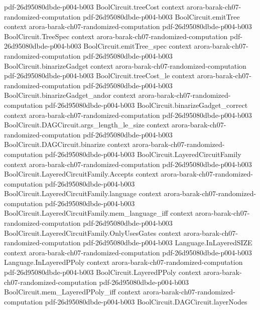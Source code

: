\begin{theorem}
  {pdf-26d95080dbde-p004-b003}
\proofstep
  {BoolCircuit.treeCost}
  {context}
  {arora-barak-ch07-randomized-computation}
  {pdf-26d95080dbde-p004-b003}
\proofstep
  {BoolCircuit.emitTree}
  {context}
  {arora-barak-ch07-randomized-computation}
  {pdf-26d95080dbde-p004-b003}
\proofstep
  {BoolCircuit.TreeSpec}
  {context}
  {arora-barak-ch07-randomized-computation}
  {pdf-26d95080dbde-p004-b003}
\proofstep
  {BoolCircuit.emitTree_spec}
  {context}
  {arora-barak-ch07-randomized-computation}
  {pdf-26d95080dbde-p004-b003}
\proofstep
  {BoolCircuit.binarizeGadget}
  {context}
  {arora-barak-ch07-randomized-computation}
  {pdf-26d95080dbde-p004-b003}
\proofstep
  {BoolCircuit.treeCost_le}
  {context}
  {arora-barak-ch07-randomized-computation}
  {pdf-26d95080dbde-p004-b003}
\proofstep
  {BoolCircuit.binarizeGadget_andor}
  {context}
  {arora-barak-ch07-randomized-computation}
  {pdf-26d95080dbde-p004-b003}
\proofstep
  {BoolCircuit.binarizeGadget_correct}
  {context}
  {arora-barak-ch07-randomized-computation}
  {pdf-26d95080dbde-p004-b003}
\proofstep
  {BoolCircuit.DAGCircuit.args_length_le_size}
  {context}
  {arora-barak-ch07-randomized-computation}
  {pdf-26d95080dbde-p004-b003}
\proofstep
  {BoolCircuit.DAGCircuit.binarize}
  {context}
  {arora-barak-ch07-randomized-computation}
  {pdf-26d95080dbde-p004-b003}
\proofstep
  {BoolCircuit.LayeredCircuitFamily}
  {context}
  {arora-barak-ch07-randomized-computation}
  {pdf-26d95080dbde-p004-b003}
\proofstep
  {BoolCircuit.LayeredCircuitFamily.Accepts}
  {context}
  {arora-barak-ch07-randomized-computation}
  {pdf-26d95080dbde-p004-b003}
\proofstep
  {BoolCircuit.LayeredCircuitFamily.language}
  {context}
  {arora-barak-ch07-randomized-computation}
  {pdf-26d95080dbde-p004-b003}
\proofstep
  {BoolCircuit.LayeredCircuitFamily.mem_language_iff}
  {context}
  {arora-barak-ch07-randomized-computation}
  {pdf-26d95080dbde-p004-b003}
\proofstep
  {BoolCircuit.LayeredCircuitFamily.OnlyUsesGates}
  {context}
  {arora-barak-ch07-randomized-computation}
  {pdf-26d95080dbde-p004-b003}
\proofstep
  {Language.InLayeredSIZE}
  {context}
  {arora-barak-ch07-randomized-computation}
  {pdf-26d95080dbde-p004-b003}
\proofstep
  {Language.InLayeredPPoly}
  {context}
  {arora-barak-ch07-randomized-computation}
  {pdf-26d95080dbde-p004-b003}
\proofstep
  {BoolCircuit.LayeredPPoly}
  {context}
  {arora-barak-ch07-randomized-computation}
  {pdf-26d95080dbde-p004-b003}
\proofstep
  {BoolCircuit.mem_LayeredPPoly_iff}
  {context}
  {arora-barak-ch07-randomized-computation}
  {pdf-26d95080dbde-p004-b003}
\proofstep
  {BoolCircuit.DAGCircuit.layerNodes}

\end{theorem}

